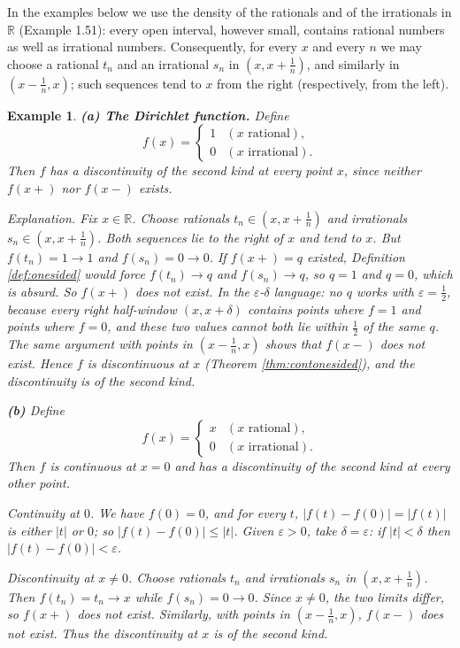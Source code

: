 \documentclass{article}
\theoremstyle{mythm}
\newtheorem{example}[theorem]{Example}
\begin{document}
In the examples below we use the density of the rationals and of the irrationals in $\mathbb{R}$ (Example 1.51): every open interval, however small, contains rational numbers as well as irrational numbers. Consequently, for every $x$ and every $n$ we may choose a rational $t_n$ and an irrational $s_n$ in $(x, x + \frac{1}{n})$, and similarly in $(x - \frac1n, x)$; such sequences tend to $x$ from the right (respectively, from the left).

\begin{example}\label{ex:rudin}
\textbf{(a) The Dirichlet function.} Define
\[
f(x) = \begin{cases} 1 & (x \text{ rational}), \\ 0 & (x \text{ irrational}). \end{cases}
\]
Then $f$ has a discontinuity of the second kind at every point $x$, since neither $f(x+)$ nor $f(x-)$ exists.

\textit{Explanation.} Fix $x \in \mathbb{R}$. Choose rationals $t_n \in (x, x + \frac1n)$ and irrationals $s_n \in (x, x + \frac1n)$. Both sequences lie to the right of $x$ and tend to $x$. But $f(t_n) = 1 \to 1$ and $f(s_n) = 0 \to 0$. If $f(x+) = q$ existed, Definition \ref{def:onesided} would force $f(t_n) \to q$ and $f(s_n) \to q$, so $q = 1$ and $q = 0$, which is absurd. So $f(x+)$ does not exist. In the $\varepsilon$-$\delta$ language: no $q$ works with $\varepsilon = \frac12$, because every right half-window $(x, x+\delta)$ contains points where $f = 1$ and points where $f = 0$, and these two values cannot both lie within $\frac12$ of the same $q$. The same argument with points in $(x - \frac1n, x)$ shows that $f(x-)$ does not exist. Hence $f$ is discontinuous at $x$ (Theorem \ref{thm:contonesided}), and the discontinuity is of the second kind.

\textbf{(b)} Define
\[
f(x) = \begin{cases} x & (x \text{ rational}), \\ 0 & (x \text{ irrational}). \end{cases}
\]
Then $f$ is continuous at $x = 0$ and has a discontinuity of the second kind at every other point.

\textit{Continuity at $0$.} We have $f(0) = 0$, and for every $t$, $|f(t) - f(0)| = |f(t)|$ is either $|t|$ or $0$; so $|f(t) - f(0)| \leq |t|$. Given $\varepsilon > 0$, take $\delta = \varepsilon$: if $|t| < \delta$ then $|f(t) - f(0)| < \varepsilon$.

\textit{Discontinuity at $x \neq 0$.} Choose rationals $t_n$ and irrationals $s_n$ in $(x, x + \frac{1}{n})$. Then $f(t_n) = t_n \to x$ while $f(s_n) = 0 \to 0$. Since $x \neq 0$, the two limits differ, so $f(x+)$ does not exist. Similarly, with points in $(x - \frac1n, x)$, $f(x-)$ does not exist. Thus the discontinuity at $x$ is of the second kind.


\end{example}
\end{document}
